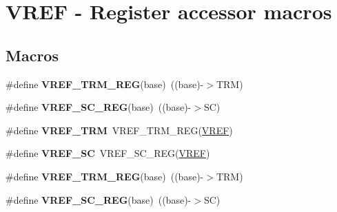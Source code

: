 \hypertarget{group__VREF__Register__Accessor__Macros}{}\section{V\+R\+EF -\/ Register accessor macros}
\label{group__VREF__Register__Accessor__Macros}
\subsection*{Macros}
\begin{DoxyCompactItemize}
\item 
\#define {\bfseries V\+R\+E\+F\+\_\+\+T\+R\+M\+\_\+\+R\+EG}(base)~((base)-\/$>$T\+RM)\hypertarget{group__VREF__Register__Accessor__Macros_ga51c446c3b654f4dad5fd525c80409401}{}\label{group__VREF__Register__Accessor__Macros_ga51c446c3b654f4dad5fd525c80409401}

\item 
\#define {\bfseries V\+R\+E\+F\+\_\+\+S\+C\+\_\+\+R\+EG}(base)~((base)-\/$>$SC)\hypertarget{group__VREF__Register__Accessor__Macros_ga8b572787c188301d54e1b361d2c02476}{}\label{group__VREF__Register__Accessor__Macros_ga8b572787c188301d54e1b361d2c02476}

\item 
\#define {\bfseries V\+R\+E\+F\+\_\+\+T\+RM}~V\+R\+E\+F\+\_\+\+T\+R\+M\+\_\+\+R\+EG(\hyperlink{group__VREF__Peripheral__Access__Layer_ga2c9e85d22a9ba37ea589b1747af46307}{V\+R\+EF})\hypertarget{group__VREF__Register__Accessor__Macros_ga3d9a836081732fa55a44bde53a2cb932}{}\label{group__VREF__Register__Accessor__Macros_ga3d9a836081732fa55a44bde53a2cb932}

\item 
\#define {\bfseries V\+R\+E\+F\+\_\+\+SC}~V\+R\+E\+F\+\_\+\+S\+C\+\_\+\+R\+EG(\hyperlink{group__VREF__Peripheral__Access__Layer_ga2c9e85d22a9ba37ea589b1747af46307}{V\+R\+EF})\hypertarget{group__VREF__Register__Accessor__Macros_ga58353078d385155f1c55fad5802549bb}{}\label{group__VREF__Register__Accessor__Macros_ga58353078d385155f1c55fad5802549bb}

\item 
\#define {\bfseries V\+R\+E\+F\+\_\+\+T\+R\+M\+\_\+\+R\+EG}(base)~((base)-\/$>$T\+RM)\hypertarget{group__VREF__Register__Accessor__Macros_ga51c446c3b654f4dad5fd525c80409401}{}\label{group__VREF__Register__Accessor__Macros_ga51c446c3b654f4dad5fd525c80409401}

\item 
\#define {\bfseries V\+R\+E\+F\+\_\+\+S\+C\+\_\+\+R\+EG}(base)~((base)-\/$>$SC)\hypertarget{group__VREF__Register__Accessor__Macros_ga8b572787c188301d54e1b361d2c02476}{}\label{group__VREF__Register__Accessor__Macros_ga8b572787c188301d54e1b361d2c02476}


\end{DoxyCompactItemize}
